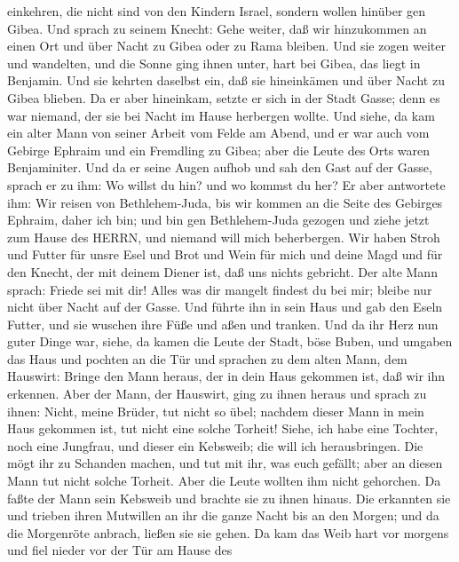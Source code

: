 einkehren, die nicht sind von den Kindern Israel, sondern wollen hinüber
gen Gibea.  Und sprach zu seinem Knecht: Gehe weiter, daß
wir hinzukommen an einen Ort und über Nacht zu Gibea oder zu Rama
bleiben.  Und sie zogen weiter und wandelten, und die Sonne
ging ihnen unter, hart bei Gibea, das liegt in Benjamin. 
Und sie kehrten daselbst ein, daß sie hineinkämen und über Nacht zu
Gibea blieben. Da er aber hineinkam, setzte er sich in der Stadt Gasse;
denn es war niemand, der sie bei Nacht im Hause herbergen wollte.
 Und siehe, da kam ein alter Mann von seiner Arbeit vom
Felde am Abend, und er war auch vom Gebirge Ephraim und ein Fremdling zu
Gibea; aber die Leute des Orts waren Benjaminiter.  Und da
er seine Augen aufhob und sah den Gast auf der Gasse, sprach er zu ihm:
Wo willst du hin? und wo kommst du her?  Er aber antwortete
ihm: Wir reisen von Bethlehem-Juda, bis wir kommen an die Seite des
Gebirges Ephraim, daher ich bin; und bin gen Bethlehem-Juda gezogen und
ziehe jetzt zum Hause des HERRN, und niemand will mich beherbergen.
 Wir haben Stroh und Futter für unsre Esel und Brot und
Wein für mich und deine Magd und für den Knecht, der mit deinem Diener
ist, daß uns nichts gebricht.  Der alte Mann sprach: Friede
sei mit dir! Alles was dir mangelt findest du bei mir; bleibe nur nicht
über Nacht auf der Gasse.  Und führte ihn in sein Haus und
gab den Eseln Futter, und sie wuschen ihre Füße und aßen und tranken.
 Und da ihr Herz nun guter Dinge war, siehe, da kamen die
Leute der Stadt, böse Buben, und umgaben das Haus und pochten an die Tür
und sprachen zu dem alten Mann, dem Hauswirt: Bringe den Mann heraus,
der in dein Haus gekommen ist, daß wir ihn erkennen.  Aber
der Mann, der Hauswirt, ging zu ihnen heraus und sprach zu ihnen: Nicht,
meine Brüder, tut nicht so übel; nachdem dieser Mann in mein Haus
gekommen ist, tut nicht eine solche Torheit!  Siehe, ich
habe eine Tochter, noch eine Jungfrau, und dieser ein Kebsweib; die will
ich herausbringen. Die mögt ihr zu Schanden machen, und tut mit ihr, was
euch gefällt; aber an diesen Mann tut nicht solche Torheit.
 Aber die Leute wollten ihm nicht gehorchen. Da faßte der
Mann sein Kebsweib und brachte sie zu ihnen hinaus. Die erkannten sie
und trieben ihren Mutwillen an ihr die ganze Nacht bis an den Morgen;
und da die Morgenröte anbrach, ließen sie sie gehen.  Da
kam das Weib hart vor morgens und fiel nieder vor der Tür am Hause des

